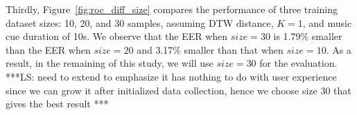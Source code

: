 Thirdly, Figure~\ref{fig:roc_diff_size} compares the performance of three training dataset sizes: 10, 20, and 30 samples, assuming DTW distance, $K=1$, and music cue duration of 10s. We observe that the EER when $size=30$ is 1.79\% smaller than the EER when $size=20$ and 3.17\% smaller than that when $size=10$. As a result, in the remaining of this study, we will use $size=30$ for the evaluation. ***LS: need to extend to emphasize it has nothing to do with user experience since we can grow it after initialized data collection, hence we choose size 30 that gives the best result ***




